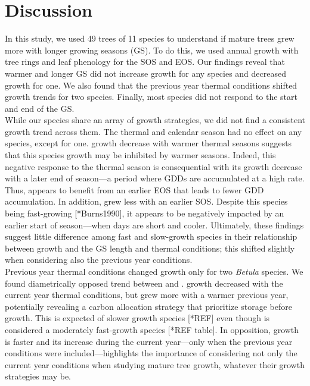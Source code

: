 \documentclass{article}\usepackage[]{graphicx}\usepackage[]{xcolor}
\begin{document}
\section*{Discussion}
In this study, we used 49 trees of 11 species to understand if mature trees grew more with longer growing seasons (GS). To do this, we used annual growth with tree rings and leaf phenology for the SOS and EOS. Our findings reveal that warmer and longer GS did not increase growth for any species and decreased growth for one. We also found that the previous year thermal conditions shifted growth trends for two species. Finally, most species did not respond to the start and end of the GS. \\

While our species share an array of growth strategies, we did not find a consistent growth trend across them. The thermal and calendar season had no effect on any species, except for one. {\Ball} growth decrease with warmer thermal seasons suggests that this species growth may be inhibited by warmer seasons. Indeed, this negative response to the thermal season is consequential with its growth decrease with a later end of season---a period where GDDs are accumulated at a high rate. Thus, {\Ball} appears to benefit from an earlier EOS that leads to fewer GDD accumulation. In addition, {\Tame} grew less with an earlier SOS. Despite this species being fast-growing [*Burns1990], it appears to be negatively impacted by an earlier start of season---when days are short and cooler. Ultimately, these findings suggest little difference among fast and slow-growth species in their relationship between growth and the GS length and thermal conditions; this shifted slightly when considering also the previous year conditions. \\

Previous year thermal conditions changed growth only for two \textit{Betula} species. We found diametrically opposed trend between {\Ball} and {\Bnig}. {\Ball} growth decreased with the current year thermal conditions, but grew more with a warmer previous year, potentially revealing a carbon allocation strategy that prioritize storage before growth. This is expected of slower growth species [*REF] even though {\Ball} is considered a moderately fast-growth species [*REF table]. In opposition, {\Bnig} growth is faster and its increase during the current year---only when the previous year conditions were included---highlights the importance of considering not only the current year conditions when studying mature tree growth, whatever their growth strategies may be. \\
\end{document}
